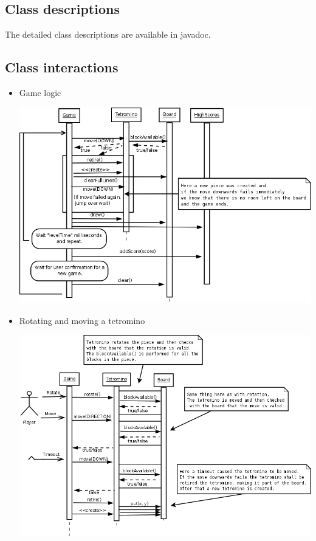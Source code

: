 \documentclass[11pt,a4paper]{article}
\begin{document}
\subsection {Class descriptions}

The detailed class descriptions are available in javadoc.

\newpage
\subsection {Class interactions}

\begin{itemize}
\item Game logic
  \begin{center}
    \includegraphics[scale=0.30]{seq_game.png}
  \end{center}

\item Rotating and moving a tetromino
  \begin{center}
    \includegraphics[scale=0.26]{seq_tetro.png}
  \end{center}
\end{itemize}
\end{document}
